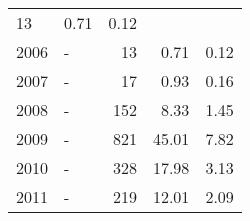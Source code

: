 \begin{longtable}{lXrrr}
       \num{13} &
       \num[round-mode=places,round-precision=2]{0.71} &
         \num[round-mode=places,round-precision=2]{0.12} \\

     2006 &
     \multicolumn{1}{X}{ -  } &


       \num{13} &
       \num[round-mode=places,round-precision=2]{0.71} &
         \num[round-mode=places,round-precision=2]{0.12} \\

     2007 &
     \multicolumn{1}{X}{ -  } &


       \num{17} &
       \num[round-mode=places,round-precision=2]{0.93} &
         \num[round-mode=places,round-precision=2]{0.16} \\

     2008 &
     \multicolumn{1}{X}{ -  } &


       \num{152} &
       \num[round-mode=places,round-precision=2]{8.33} &
         \num[round-mode=places,round-precision=2]{1.45} \\

     2009 &
     \multicolumn{1}{X}{ -  } &


       \num{821} &
       \num[round-mode=places,round-precision=2]{45.01} &
         \num[round-mode=places,round-precision=2]{7.82} \\

     2010 &
     \multicolumn{1}{X}{ -  } &


       \num{328} &
       \num[round-mode=places,round-precision=2]{17.98} &
         \num[round-mode=places,round-precision=2]{3.13} \\

     2011 &
     \multicolumn{1}{X}{ -  } &


       \num{219} &
       \num[round-mode=places,round-precision=2]{12.01} &
         \num[round-mode=places,round-precision=2]{2.09} \\


\end{longtable}
